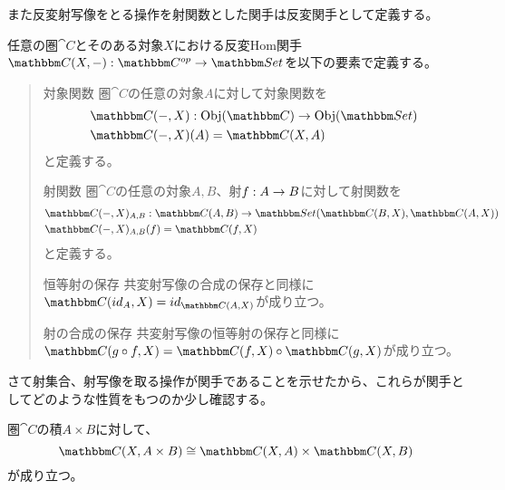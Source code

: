 	また反変射写像をとる操作を射関数とした関手は反変関手として定義する。
		\begin{define}[反変Hom関手]\label{def-contravariant-hom-functor}
		任意の圏$\cat{C}$とそのある対象$X$における反変Hom関手$\functor{\arset{C}{X}{-}}{C^{op}}{Set}$を以下の要素で定義する。
		\begin{quote}
			\begin{mydescription}
				\item[対象関数] 圏$\cat{C}$の任意の対象$A$に対して対象関数を
				\begin{align*}
					&\mor{\arset{C}{-}{X}}{\obj{C}}{\obj{Set}}\\
					&\arset{C}{-}{X}(A)=\arset{C}{X}{A}
				\end{align*}
				と定義する。
				\item[射関数] 圏$\cat{C}$の任意の対象$A,B$、射$f:A\rightarrow B$に対して射関数を
				\begin{align*}
					&\mor{\arset{C}{-}{X}_{A,B}}{\arset{C}{A}{B}}{\arset{Set}{\arset{C}{B}{X}}{\arset{C}{A}{X}}}\\
					&\arset{C}{-}{X}_{A,B}(f)=\arset{C}{f}{X}
				\end{align*}
				と定義する。
				\begin{center}
				\end{center}
				\item[恒等射の保存] 共変射写像の合成の保存と同様に$\arset{C}{id_A}{X}=id_{\arset{C}{A}{X}}$が成り立つ。
				\item[射の合成の保存] 共変射写像の恒等射の保存と同様に$\arset{C}{g\circ f}{X}=\arset{C}{f}{X}\circ\arset{C}{g}{X}$が成り立つ。
			\end{mydescription}
		\end{quote}
	\end{define}
  さて射集合、射写像を取る操作が関手であることを示せたから、これらが関手としてどのような性質をもつのか少し確認する。
	\begin{prop}[Hom関手の積の保存]\label{prop-preservation-product-by-hom-functor}
		圏$\cat{C}$の積$A\times B$に対して、\[\arset{C}{X}{A\times B}\cong \arset{C}{X}{A}\times \arset{C}{X}{B}\]が成り立つ。
	\end{prop}

